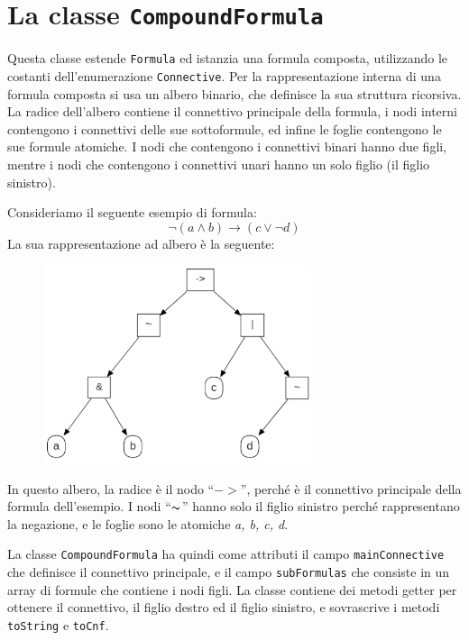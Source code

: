 \documentclass[a4paper,12pt]{report}
\begin{document}
\section{La classe \texttt{CompoundFormula}}
Questa classe estende \texttt{Formula} ed istanzia una formula composta, utilizzando le costanti dell'enumerazione \texttt{Connective}. Per la rappresentazione interna di una formula composta si usa un albero binario, che definisce la sua struttura ricorsiva. La radice dell'albero contiene il connettivo principale della formula, i nodi interni contengono i connettivi delle sue sottoformule, ed infine le foglie contengono le sue formule atomiche. I nodi che contengono i connettivi binari hanno due figli, mentre i nodi che contengono i connettivi unari hanno un solo figlio (il figlio sinistro).

Consideriamo il seguente esempio di formula:
\[\lnot(a \land b) \to (c \lor \lnot d)\]
La sua rappresentazione ad albero è la seguente:
\begin{figure}[H]
    \centering
    \includegraphics[width=0.7\textwidth, height=0.4\textheight]{img/albero.png}
\end{figure}
In questo albero, la radice è il nodo ``$-\!>$'', perché è il connettivo principale della formula dell'esempio. I nodi ``$\thicksim$'' hanno solo il figlio sinistro perché rappresentano la negazione, e le foglie sono le atomiche \emph{a, b, c, d}.

La classe \texttt{CompoundFormula} ha quindi come attributi il campo \texttt{mainConnective} che definisce il connettivo principale, e il campo \texttt{subFormulas} che consiste in un array di formule che contiene i nodi figli. La classe contiene dei metodi getter per ottenere il connettivo, il figlio destro ed il figlio sinistro, e sovrascrive i metodi \texttt{toString} e \texttt{toCnf}.
\end{document}
